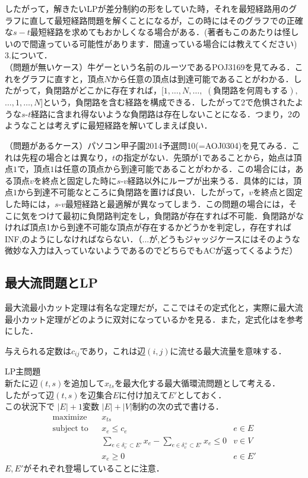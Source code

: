\documentclass[13pt]{jarticle}
\theoremstyle{nonitalic} %
\begin{document}
したがって，解きたいLPが差分制約の形をしていた時，それを最短経路用のグラフに直して最短経路問題を解くことになるが，この時にはそのグラフでの正確な$s-t$最短経路を求めてもおかしくなる場合がある．(著者もこのあたりは怪しいので間違っている可能性があります．間違っている場合には教えてください)\\

3.について．\\

（問題が無いケース）牛ゲーという名前のルーツであるPOJ3169を見てみる．これをグラフに直すと，頂点$N$から任意の頂点は到達可能であることがわかる．したがって，負閉路がどこかに存在すれば，[$1, \dots ,N,\dots,$ $ ( \textrm{負閉路を何周もする} ),$ $\dots ,1, \dots, N$]という，負閉路を含む経路を構成できる．したがって2で危惧されたような$s$-$t$経路に含まれ得ないような負閉路は存在しないことになる．つまり，2のようなことは考えずに最短経路を解いてしまえば良い．

（問題があるケース）パソコン甲子園2014予選問10(=AOJ0304)を見てみる．これは先程の場合とは異なり，$t$の指定がない．先頭が$1$であることから，始点は頂点$1$で，頂点$1$は任意の頂点から到達可能であることがわかる．この場合には，ある頂点$v$を終点と固定した時に$s$-$v$経路以外にループが出来うる．具体的には，頂点$1$から到達不可能なところに負閉路を置けば良い．したがって，$v$を終点と固定した時には，$s$-$v$最短経路と最適解が異なってしまう．この問題の場合には，そこに気をつけて最初に負閉路判定をし，負閉路が存在すれば不可能．負閉路がなければ頂点1から到達不可能な頂点が存在するかどうかを判定し，存在すればINF,のようにしなければならない．（...が,どうもジャッジケースにはそのような微妙な入力は入っていないようであるのでどちらでもACが返ってくるようだ）



\subsection{最大流問題とLP}
最大流最小カット定理は有名な定理だが，ここではその定式化と，実際に最大流最小カット定理がどのように双対になっているかを見る．また，定式化は\cite{kinji}を参考にした．

与えられる定数は$c_{ij}$であり，これは辺$(i,j)$に流せる最大流量を意味する．

LP主問題 \\
新たに辺$(t,s)$を追加して$x_{ts}$を最大化する最大循環流問題として考える． \\
したがって辺$(t,s)$を辺集合$E$に付け加えて$E'$としておく．\\
この状況下で $|E|+1$変数 $|E|+|V|$制約の次の式で書ける．
\begin{align}
 &&&&&\textrm{maximize}   && x_{ts}  \\
 &&&&&\textrm{subject to} && x_e\leq c_e & e \in E  &&&&&\\
 &&&&&                    && \sum_{e \in \delta_v^- \subset E'} x_e - \sum_{e \in \delta_v^+  \subset E'} x_e \leq 0 & v \in V &&&&& \\
 &&&&&                    && x_e \geq 0 & e \in E' &&&&&
\end{align}
$E, E'$がそれぞれ登場していることに注意．
\end{document}
